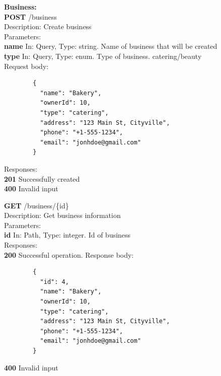 \documentclass[11pt,a4paper,pdftex]{article}
\begin{document}
\textbf{Business:}\\
\hspace*{1em}\textbf{POST} /business\\
\hspace*{2em}Description: Create business\\
\hspace*{2em}Parameters:\\
\hspace*{3em}\textbf{name} In: Query, Type: string. Name of business that will be created\\
\hspace*{3em}\textbf{type} In: Query, Type: enum. Type of business. catering/beauty\\
\hspace*{2em}Request body:
\begin{verbatim}
        {
          "name": "Bakery",
          "ownerId": 10,
          "type": "catering",
          "address": "123 Main St, Cityville",
          "phone": "+1-555-1234",
          "email": "jonhdoe@gmail.com"
        }
\end{verbatim}
\hspace*{2em}Responses:\\
\hspace*{3em}\textbf{201} Successfully created\\
\hspace*{3em}\textbf{400} Invalid input

\hspace*{1em}\textbf{GET} /business/\{id\}\\
\hspace*{2em}Description: Get business information\\
\hspace*{2em}Parameters:\\
\hspace*{3em}\textbf{id} In: Path, Type: integer. Id of business\\
\hspace*{2em}Responses:\\
\hspace*{3em}\textbf{200} Successful operation. Response body:
\begin{verbatim}
        {
          "id": 4,
          "name": "Bakery",
          "ownerId": 10,
          "type": "catering",
          "address": "123 Main St, Cityville",
          "phone": "+1-555-1234",
          "email": "jonhdoe@gmail.com"
        }
\end{verbatim}
\hspace*{3em}\textbf{400} Invalid input
\end{document}
